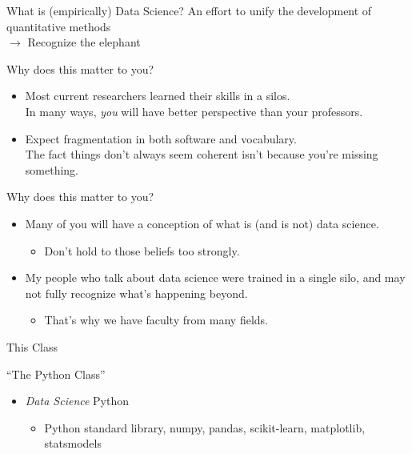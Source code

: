 \documentclass[11pt]{beamer}
\begin{document}
\begin{frame}[c]{What is (empirically) Data Science?}
\pause An effort to unify the development of quantitative methods \\
\pause $\rightarrow$ Recognize the elephant
\end{frame}

\begin{frame}[c]{Why does this matter to you?}
\begin{itemize}
	\item Most current researchers learned their skills in a silos. \\
	\pause In many ways, \alert{\emph{you} will have better perspective than your professors.}
	\pause \item Expect fragmentation in both software and vocabulary. \\
	\pause The fact things don't always seem coherent isn't because you're missing something.
\end{itemize}
\end{frame}


\begin{frame}[c]{Why does this matter to you?}
\begin{itemize}
	\item Many of you will have a conception of what is (and is not) data science.
	\begin{itemize}
		\pause \item Don't hold to those beliefs too strongly.
	\end{itemize}
	\pause \item My people who talk about data science were trained in a single silo, and may not fully recognize what's happening beyond.
	\begin{itemize}
		\pause \item That's why we have faculty from many fields.
	\end{itemize}
\end{itemize}
\end{frame}

\begin{frame}[c]{This Class}

``The Python Class'' \\

\begin{itemize}
	\pause \item \emph{Data Science} Python
	\begin{itemize}
		\pause \item Python standard library, numpy, pandas, scikit-learn, matplotlib, statsmodels
	\end{itemize}
\end{itemize}
\end{frame}
\end{document}
